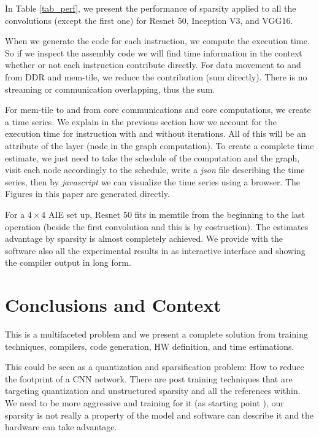 \documentclass[sigconf]{acmart}
\begin{document}
In Table \ref{tab_perf}, we present the performance of sparsity
applied to all the convolutions (except the first one) for Resnet 50,
Inception V3, and VGG16.


When we generate the code for each instruction, we compute the
execution time. So if we inspect the assembly code we will find time
information in the context whether or not each instruction contribute
directly. For data movement to and from DDR and mem-tile, we reduce
the contribution (sum directly). There is no streaming or
communication overlapping, thus the sum.

For mem-tile to and from core communications and core computations, we
create a time series. We explain in the previous section how we
account for the execution time for instruction with and without
iterations. All of this will be an attribute of the layer (node in the
graph computation).  To create a complete time estimate, we just need
to take the schedule of the computation and the graph, visit each node
accordingly to the schedule, write a {\em json} file describing the
time series, then by {\em javascript} we can visualize the time series
using a browser. The Figures in this paper are generated directly.

For a $4\times 4$ AIE set up, Resnet 50 fits in memtile from the
beginning to the last operation (beside the first convolution and this
is by costruction). The estimates advantage by sparsity is almost
completely achieved. We provide with the software also all the
experimental results in \cite{PaoloK2020} as interactive interface and
showing the compiler output in long form.

\section{Conclusions and Context}
This is a multifaceted problem and we present a complete solution from
training techniques, compilers, code generation, HW definition, and
time estimations.

This could be seen as a quantization and sparsification problem: How
to reduce the footprint of a CNN network. There are post training
techniques that are targeting quantization and unstructured sparsity
\cite{frantar2023gptq} and all the references within. We need to be
more aggressive and training for it (as starting point
\cite{abs-2102-11289}), our sparsity is not really a property of the
model and software can describe it and the hardware can take
advantage.
\end{document}

